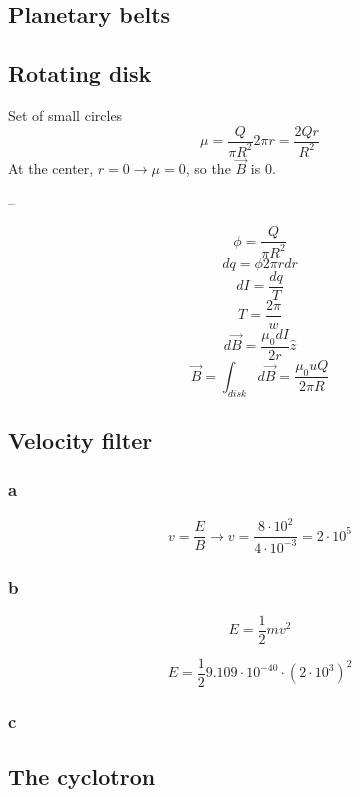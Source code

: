 \subsection{Planetary belts}

\subsection{Rotating disk}
Set of small circles
\[
	\mu = \frac{Q}{\pi R^2} 2 \pi r = \frac{2 Q r}{R^2}
\]
At the center, \(r = 0 \to \mu = 0\), so the \(\vec{B}\) is 0.

--

\[
	\phi = \frac{Q}{\pi R^2}
\]
\[
	dq = \phi 2 \pi r dr
\]
\[
	dI = \frac{dq}{T}
\]
\[
	T = \frac{2 \pi}{w}
\]
\[
	d \vec{B} = \frac{\mu_0 d I}{2 r} \hat{z}
\]
\[
	\vec{B} = \int_{disk} d \vec{B} = \frac{\mu_0 u Q}{2 \pi R}
\]

\subsection{Velocity filter}

\subsubsection{a}
\[
	v = \frac{E}{B}
	\to v = \frac{8 \cdot 10^2}{4 \cdot 10^{-3}} = 2 \cdot 10^5
\]

\subsubsection{b}
\[E = \frac{1}{2} m v^2\]

\[E = \frac{1}{2} 9.109 \cdot 10^{-40} \cdot (2 \cdot 10^3)^2\]

\subsubsection{c}
\todo{}

\subsection{The cyclotron}
\todo{}
